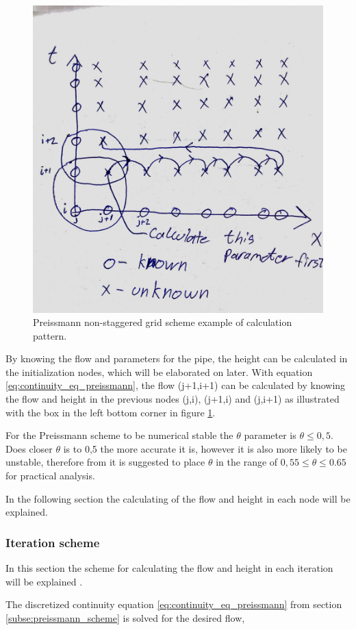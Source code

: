 \begin{figure}[H]
\centering
\includegraphics[width=.6\textwidth]{report/simulation/pictures/preissmann_scheme_exempel}
\caption{Preissmann non-staggered grid scheme example of calculation pattern.}
\label{fig:preissmann_grid_scheme_exampel}
\end{figure}
By knowing the flow and parameters for the pipe, the height can be calculated in the initialization nodes, which will be elaborated on later. With equation \ref{eq:continuity_eq_preissmann}, the flow (j+1,i+1) can be calculated by knowing the flow and height in the previous nodes (j,i), (j+1,i) and (j,i+1) as illustrated with the box in the left bottom corner in figure \ref{fig:preissmann_grid_scheme_exampel}.

For the Preissmann scheme to be numerical stable the $\theta$ parameter is $\theta \leq 0,5$. Does closer $\theta$ is to 0,5 the more accurate it is, however it is also more likely to be unstable, therefore from \cite{theta_decision} it is suggested to place $\theta$ in the range of $0,55 \leq \theta \leq 0.65$ for practical analysis.

In the following section the calculating of the flow and height in each node will be explained.

\subsubsection*{Iteration scheme}
In this section the scheme for calculating the flow and height in each iteration will be explained \cite{ikke_stationear}.

The discretized continuity equation \ref{eq:continuity_eq_preissmann} from section \ref{subse:preissmann_scheme} is solved for the desired flow,

